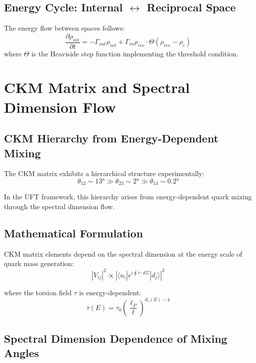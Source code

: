 \documentclass[12pt,a4paper]{article}
\begin{document}
\subsection{Energy Cycle: Internal $\leftrightarrow$ Reciprocal Space}

The energy flow between spaces follows:
\begin{equation}
    \frac{\partial \rho_{int}}{\partial t} = -\Gamma_{out}\rho_{int} + \Gamma_{in}\rho_{rec} \cdot \Theta(\rho_{rec} - \rho_c)
\end{equation}
where $\Theta$ is the Heaviside step function implementing the threshold condition.

\section{CKM Matrix and Spectral Dimension Flow}
\label{app:ckm}

\subsection{CKM Hierarchy from Energy-Dependent Mixing}

The CKM matrix exhibits a hierarchical structure experimentally:
\begin{equation}
    \theta_{12} \sim 13° \gg \theta_{23} \sim 2° \gg \theta_{13} \sim 0.2°
\end{equation}

In the UFT framework, this hierarchy arises from energy-dependent quark mixing through the spectral dimension flow.

\subsection{Mathematical Formulation}

CKM matrix elements depend on the spectral dimension at the energy scale of quark mass generation:
\begin{equation}
    |V_{ij}|^2 \propto \left|\langle u_i | e^{i\oint \tau \cdot d\Sigma} | d_j \rangle\right|^2
\end{equation}

where the torsion field $\tau$ is energy-dependent:
\begin{equation}
    \tau(E) = \tau_0 \left(\frac{\ell_P}{\ell}\right)^{d_s(E)-4}
\end{equation}

\subsection{Spectral Dimension Dependence of Mixing Angles}
\end{document}
